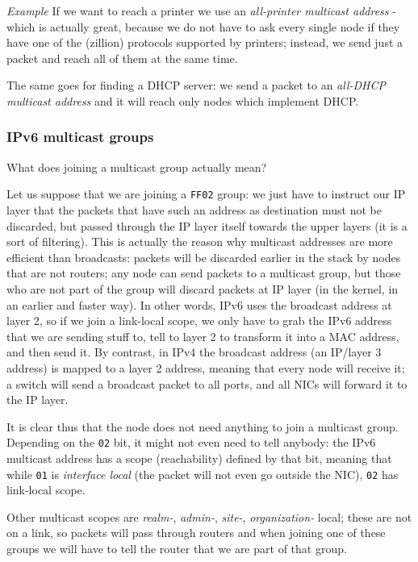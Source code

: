 \emph{Example} If we want to reach a printer we use an \textit{all-printer multicast address} - which is actually great, because we do not have to ask every single node if they have one of the (zillion) protocols supported by printers; instead, we send just a packet and reach all of them at the same time.

The same goes for finding a DHCP server: we send a packet to an \textit{all-DHCP multicast address} and it will reach only nodes which implement DHCP.

\vspace{0.5em}


\subsubsection{IPv6 multicast groups}
What does joining a multicast group actually mean?

Let us suppose that we are joining a \texttt{FF02} group: we just have to instruct our IP layer that the packets that have such an address as destination must not be discarded, but passed through the IP layer itself towards the upper layers (it is a sort of filtering). This is actually the reason why multicast addresses are more efficient than broadcasts: packets will be discarded earlier in the stack by nodes that are not routers; any node can send packets to a multicast group, but those who are not part of the group will discard packets at IP layer (in the kernel, in an earlier and faster way). In other words, IPv6 uses the broadcast address at layer 2, so if we join a link-local scope, we only have to grab the IPv6 address that we are sending stuff to, tell to layer 2 to transform it into a MAC address, and then send it. By contrast, in IPv4 the broadcast address (an IP/layer 3 address) is mapped to a layer 2 address, meaning that every node will receive it; a switch will send a broadcast packet to all ports, and all NICs will forward it to the IP layer.

It is clear thus that the node does not need anything to join a multicast group. Depending on the \texttt{02} bit, it might not even need to tell anybody: the IPv6 multicast address has a scope (reachability) defined by that bit, meaning that while \texttt{01} is \textit{interface local} (the packet will not even go outside the NIC), \texttt{02} has link-local scope. 

Other multicast scopes are \textit{realm-}, \textit{admin-}, \textit{site-}, \textit{organization-} local; these are not on a link, so packets will pass through routers and when joining one of these groups we will have to tell the router that we are part of that group.

